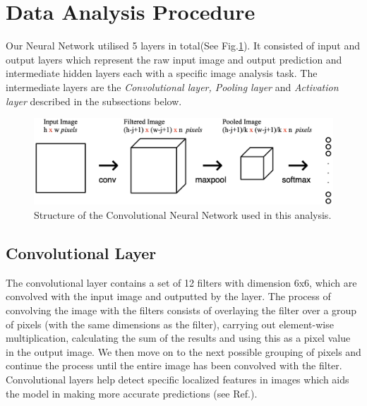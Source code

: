 \documentclass[conference]{IEEEtran}
\begin{document}
\section{Data Analysis Procedure}



\indent Our Neural Network utilised 5 layers in total(See Fig.\ref{fig:CNN_layers}). It consisted of input and output layers which represent the raw input image and output prediction and intermediate hidden layers each with a specific image analysis task. The intermediate layers are the \emph{Convolutional layer, Pooling layer} and \emph{Activation layer} described in the subsections below.\\

\begin{figure}[ht!]
  \centering
  \includegraphics[scale=0.2]{images/CNN_layers.png}
  \caption{Structure of the Convolutional Neural Network used in this analysis.}
  \label{fig:CNN_layers}

\end{figure}

\subsection{Convolutional Layer}
The convolutional layer contains a set of 12 filters with dimension 6x6,  which are convolved with the input image and outputted by the layer. The process of convolving the image with the filters consists of overlaying the filter over a group of pixels (with the same dimensions as the filter), carrying out element-wise multiplication, calculating the sum of the results and using this as a pixel value in the output image. We then move on to the next possible grouping of pixels and continue the process until the entire image has been convolved with the filter. Convolutional layers help detect specific localized features in images which aids the model in making more accurate predictions (see Ref.\cite{CNNPart1_VZ_2019}).
\end{document}
